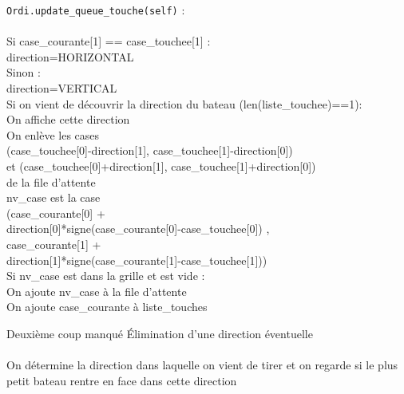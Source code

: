 {
\begin{frame}[allowframebreaks]
\texttt{Ordi.update\_queue\_touche(self)} :\\~\\

Si case\_courante[1] == case\_touchee[1] :\\
direction=HORIZONTAL\\
Sinon :\\
direction=VERTICAL\\
Si on vient de découvrir la direction du bateau (len(liste\_touchee)==1):\\
On affiche cette direction\\
On enlève les cases \\
 (case\_touchee[0]-direction[1], case\_touchee[1]-direction[0])\\ 
et (case\_touchee[0]+direction[1], case\_touchee[1]+direction[0])\\
de la file d'attente\\
\framebreak
nv\_case est la case\\
(case\_courante[0] +\\
 direction[0]*signe(case\_courante[0]-case\_touchee[0]) ,\\
 case\_courante[1] +\\
 direction[1]*signe(case\_courante[1]-case\_touchee[1]))\\
Si nv\_case est dans la grille et est vide :\\
On ajoute nv\_case à la file d'attente\\
On ajoute case\_courante à liste\_touches\\
\end{frame}
}

\begin{frame}{Deuxième coup manqué}
Élimination d'une direction éventuelle\\~\\ \pause
On détermine la direction dans laquelle on vient de tirer et on regarde si le plus petit bateau rentre en face dans cette direction
\end{frame}

